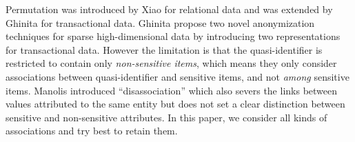 Permutation was introduced by Xiao \etal \cite{Xiao:2006:Anatomy} for
relational data and was extended by
Ghinita \etal \cite{2011:TKDE:Anonymous}
for transactional data.
Ghinita \etal propose two novel anonymization techniques for sparse
high-dimensional data by introducing two representations for transactional
data. However the limitation is that the quasi-identifier is restricted to
contain only {\em non-sensitive items}, which means they only
consider associations between quasi-identifier
and sensitive items, and not {\em among} sensitive items.
Manolis \etal \cite{terrovitis:privacy} introduced ``disassociation''
which also severs the links between values attributed to the 
same entity but does not
set a clear distinction between sensitive and non-sensitive attributes.
In this paper, we consider all kinds of associations and try best to
retain them.
%

